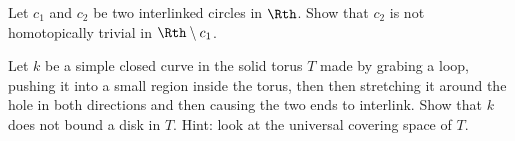\begin{alist}
\item Let $c_1$ and $c_2$ be two interlinked circles in $\Rth$.
Show that $c_2$ is not homotopically trivial in $\Rth \setminus c_1$.
\item Let $k$ be a simple closed curve in the solid torus $T$ made by
grabing a loop, pushing it into a small region inside the torus, then
then stretching it around the hole in both directions and then causing
the two ends to interlink. Show that $k$ does not bound a disk in
$T$. Hint: look at the universal covering space of $T$.
\end{alist}
